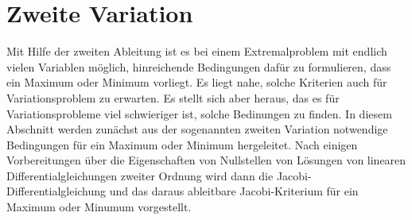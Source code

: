 %
%
%
\chapter{Zweite Variation
\label{buch:chapter:variation2}}
Mit Hilfe der zweiten Ableitung ist es bei einem Extremalproblem
mit endlich vielen Variablen möglich, hinreichende Bedingungen dafür
zu formulieren, dass ein Maximum oder Minimum vorliegt.
Es liegt nahe, solche Kriterien auch für Variationsproblem
zu erwarten.
Es stellt sich aber heraus, das es für Variationsprobleme viel
schwieriger ist, solche Bedinungen zu finden.
In diesem Abschnitt werden zunächst aus der sogenannten zweiten
Variation notwendige Bedingungen für ein Maximum oder Minimum
hergeleitet.
Nach einigen Vorbereitungen über die Eigenschaften von Nullstellen
von Lösungen von linearen Differentialgleichungen zweiter Ordnung
wird dann die Jacobi-Differentialgleichung und das daraus ableitbare
Jacobi-Kriterium für ein Maximum oder Minumum vorgestellt.






